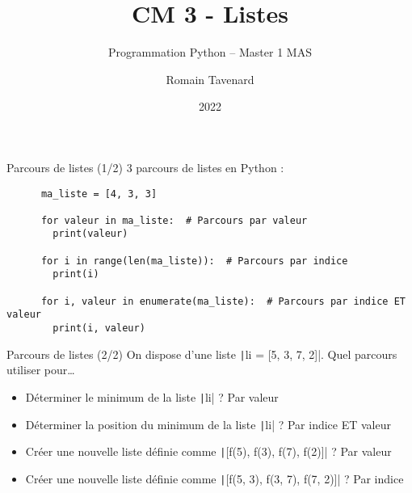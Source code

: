 \documentclass[10pt]{beamer}
\title[M1 MAS -- Python -- Listes]{CM 3 - Listes}
\subtitle{Programmation Python -- Master 1 MAS}
\author{Romain Tavenard}
\date{2022}
\institute{%
\hypersetup{urlcolor=.}
\makebox[2.2ex][c]{\faEnvelope}\enspace\href{mailto:romain.tavenard@univ-rennes2.fr}{\texttt{romain.tavenard@univ-rennes2.fr}}\\%
}
\begin{document}
\maketitle


\begin{frame}[fragile]{Parcours de listes (1/2)}  
  3 parcours de listes en Python :

  \begin{beamercodeblock}
    \begin{verbatim}
      ma_liste = [4, 3, 3]

      for valeur in ma_liste:  # Parcours par valeur
        print(valeur)
      
      for i in range(len(ma_liste)):  # Parcours par indice
        print(i)
      
      for i, valeur in enumerate(ma_liste):  # Parcours par indice ET valeur
        print(i, valeur)
    \end{verbatim}
  \end{beamercodeblock}
\end{frame}

\begin{frame}[fragile]{Parcours de listes (2/2)}  
  On dispose d'une liste \texttt|li = [5, 3, 7, 2]|.
  Quel parcours utiliser pour\dots

  \begin{itemize}
    \item Déterminer le minimum de la liste \texttt|li| ? \pause \alert{Par valeur}
    \item Déterminer la position du minimum de la liste \texttt|li| ? \pause \alert{Par indice ET valeur}
    \item Créer une nouvelle liste définie comme \texttt|[f(5), f(3), f(7), f(2)]| ? \pause \alert{Par valeur}
    \item Créer une nouvelle liste définie comme \texttt|[f(5, 3), f(3, 7), f(7, 2)]| ? \pause \alert{Par indice}
  \end{itemize}
\end{frame}
\end{document}
